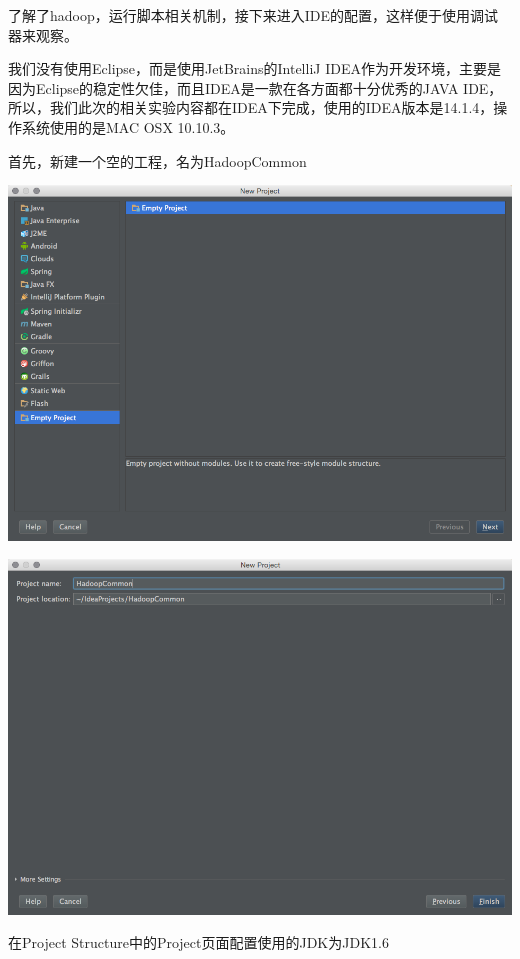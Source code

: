了解了hadoop，运行脚本相关机制，接下来进入IDE的配置，这样便于使用调试器来观察。

我们没有使用Eclipse，而是使用JetBrains的IntelliJ IDEA作为开发环境，主要是因为Eclipse的稳定性欠佳，而且IDEA是一款在各方面都十分优秀的JAVA IDE，所以，我们此次的相关实验内容都在IDEA下完成，使用的IDEA版本是14.1.4，操作系统使用的是MAC OSX 10.10.3。

首先，新建一个空的工程，名为HadoopCommon

\includegraphics[width=\textwidth]{image/env/cr21.png}

\includegraphics[width=\textwidth]{image/env/cr22.png}

在Project Structure中的Project页面配置使用的JDK为JDK1.6

